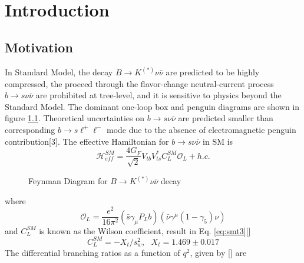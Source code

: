 \chapter{Introduction}
\label{c:intro}
\section{Motivation}
In Standard Model, the decay $B \rightarrow K^{(*)} \nu \bar{\nu}$ are predicted to be highly compressed, the proceed through the flavor-change neutral-current process $b \rightarrow s\nu\bar{\nu}$ are prohibited at tree-level, and it is sensitive to physics beyond the Standard Model. The dominant one-loop box and penguin diagrams are shown in figure \ref{FD}. Theoretical uncertainties on $b \rightarrow s\nu\bar{\nu}$ are predicted smaller than corresponding $b \rightarrow s\ell^+\ell^-$ mode due to the absence of electromagnetic penguin contribution[3]. The effective Hamiltonian for $b \rightarrow s\nu\bar{\nu}$ in SM is\\
\begin{equation}
\label{eq:smt1}
\mathcal{H}^{SM}_{eff} = \frac{4G_F}{\sqrt{2}}V_{tb}V_{ts}^*C^{SM}_L \mathcal{O}_L + h.c.
\end{equation}
\begin{figure}[h]
	\centering
	
	\caption{Feynman Diagram for $B \rightarrow K^{(*)} \nu \bar{\nu}$ decay }
	\label{FD}	
\end{figure}
\newpage
where
\begin{equation}
\label{eq:smt2}
\mathcal{O}_L = \frac{e^2}{16\pi^2} (\bar{s}\gamma_{\mu}P_L b)(\bar{\nu}\gamma^{\mu}(1-\gamma_5)\nu)
\end{equation}
and $C^{SM}_{L}$ is known as the Wilson coefficient, result in Eq. \ref{eq:smt3}[]
\begin{equation}
\label{eq:smt3}
C^{SM}_{L} = -X_t / s^2_w, ~~~ X_t = 1.469\pm 0.017
\end{equation}
The differential branching ratios as a function of $q^2$, given by [] are


